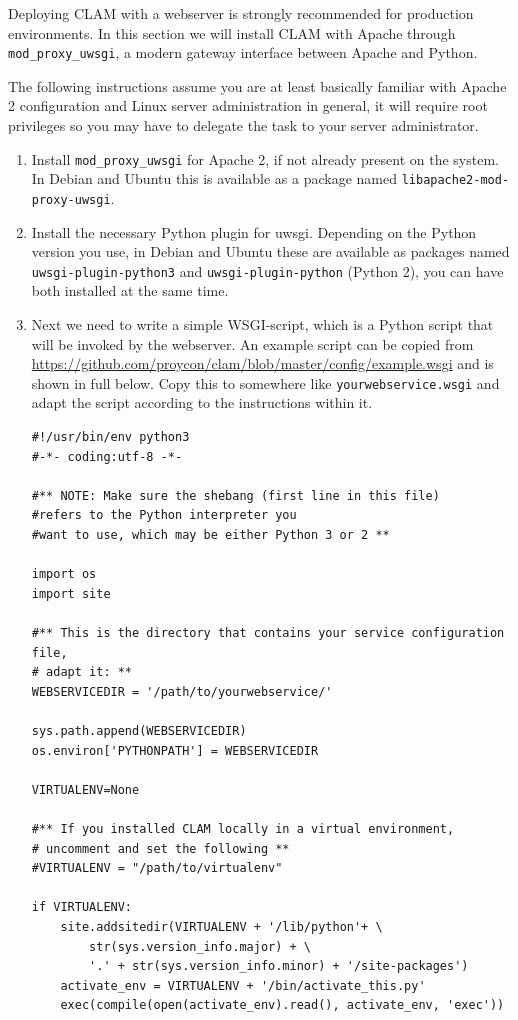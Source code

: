 \documentclass[a4paper,12pt,twoside,openright]{report}
\begin{document}
Deploying CLAM with a webserver is strongly recommended for production
environments. In this section we will install CLAM with Apache through
\texttt{mod\_proxy\_uwsgi}, a modern gateway interface between Apache and
Python.  

The following instructions assume you are at least
basically familiar with Apache 2 configuration and Linux server administration
in general, it will require root privileges so you may have to delegate the
task to your server administrator.

\begin{enumerate}[leftmargin=5mm]
\item Install \texttt{mod\_proxy\_uwsgi} for Apache 2, if not already
present on the system. In Debian and Ubuntu this is available as a package
named \texttt{libapache2-mod-proxy-uwsgi}.
\item Install the necessary Python plugin for uwsgi. Depending on the Python
    version you use, in Debian and Ubuntu these are available as packages
    named \texttt{uwsgi-plugin-python3} and \texttt{uwsgi-plugin-python}
    (Python 2), you can have both installed at the same time.
\item Next we need to write a simple
WSGI-script, which is a Python script that will be invoked by the
webserver. An example script can be copied from
\url{https://github.com/proycon/clam/blob/master/config/example.wsgi} and
is shown in full below. Copy this to somewhere like
\texttt{yourwebservice.wsgi} and adapt the script according to the instructions
within it.

{ \small
\begin{verbatim}
#!/usr/bin/env python3
#-*- coding:utf-8 -*-

#** NOTE: Make sure the shebang (first line in this file) 
#refers to the Python interpreter you
#want to use, which may be either Python 3 or 2 **

import os
import site

#** This is the directory that contains your service configuration file, 
# adapt it: **
WEBSERVICEDIR = '/path/to/yourwebservice/'

sys.path.append(WEBSERVICEDIR)
os.environ['PYTHONPATH'] = WEBSERVICEDIR

VIRTUALENV=None

#** If you installed CLAM locally in a virtual environment,
# uncomment and set the following **
#VIRTUALENV = "/path/to/virtualenv"

if VIRTUALENV:
    site.addsitedir(VIRTUALENV + '/lib/python'+ \
        str(sys.version_info.major) + \
        '.' + str(sys.version_info.minor) + '/site-packages')
    activate_env = VIRTUALENV + '/bin/activate_this.py'
    exec(compile(open(activate_env).read(), activate_env, 'exec'))


\end{verbatim}}
\end{enumerate}
\end{document}
